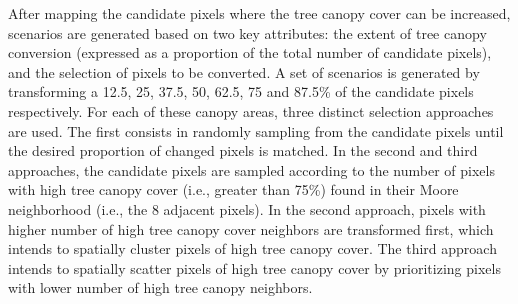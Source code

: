 \documentclass[10pt,letterpaper]{article}
\begin{document}
After mapping the candidate pixels where the tree canopy cover can be increased, scenarios are generated based on two key attributes: the extent of tree canopy conversion (expressed as a proportion of the total number of candidate pixels), and the selection of pixels to be converted.
A set of scenarios is generated by transforming a 12.5, 25, 37.5, 50, 62.5, 75 and 87.5\% of the candidate pixels respectively.
For each of these canopy areas, three distinct selection approaches are used. The first consists in randomly sampling from the candidate pixels until the desired proportion of changed pixels is matched.
In the second and third approaches, the candidate pixels are sampled according to the number of pixels with high tree canopy cover (i.e., greater than 75\%) found in their Moore neighborhood (i.e., the 8 adjacent pixels). In the second approach, pixels with higher number of high tree canopy cover neighbors are transformed first, which intends to spatially cluster pixels of high tree canopy cover.
The third approach intends to spatially scatter pixels of high tree canopy cover by prioritizing pixels with lower number of high tree canopy neighbors.
\end{document}
